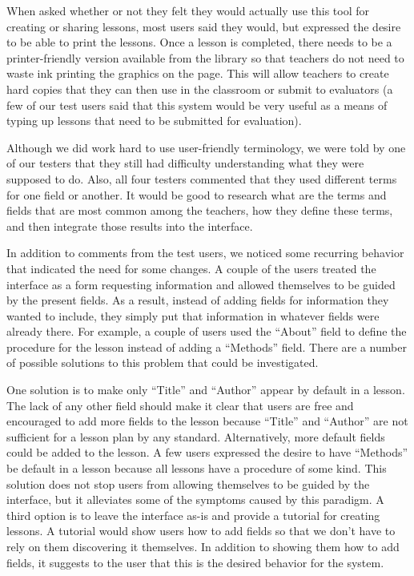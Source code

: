 \documentclass[10pt,letter]{article}
\begin{document}
When asked whether or not they felt they would actually use this tool for
creating or sharing lessons, most users said they would, but expressed the
desire to be able to print the lessons. Once a lesson is completed, there needs
to be a printer-friendly version available from the library so that teachers do
not need to waste ink printing the graphics on the page. This will allow
teachers to create hard copies that they can then use in the classroom or submit
to evaluators (a few of our test users said that this system would be very
useful as a means of typing up lessons that need to be submitted for evaluation).

Although we did work hard to use user-friendly terminology, we were told by
one of our testers that they still had difficulty understanding what they were
supposed to do.  Also, all four testers commented that they used different
terms for one field or another.  It would be good to research what are the
terms and fields that are most common among the teachers, how they define these
terms, and then integrate those results into the interface.

In addition to comments from the test users, we noticed some recurring behavior
that indicated the need for some changes. A couple of the users treated the
interface as a form requesting information and allowed themselves to be guided
by the present fields. As a result, instead of adding fields for information
they wanted to include, they simply put that information in whatever fields were
already there. For example, a couple of users used the ``About'' field to define
the procedure for the lesson instead of adding a ``Methods'' field. There are a
number of possible solutions to this problem that could be investigated.

One solution is to make only ``Title'' and ``Author'' appear by default in a
lesson.  The lack of any other field should make it clear that users are free
and encouraged to add more fields to the lesson because ``Title'' and ``Author''
are not sufficient for a lesson plan by any standard. Alternatively, more
default fields could be added to the lesson. A few users expressed the desire to
have ``Methods'' be default in a lesson because all lessons have a procedure of
some kind. This solution does not stop users from allowing themselves to be
guided by the interface, but it alleviates some of the symptoms caused by this
paradigm. A third option is to leave the interface as-is and provide a tutorial
for creating lessons. A tutorial would show users how to add fields so that we
don't have to rely on them discovering it themselves. In addition to showing
them how to add fields, it suggests to the user that this is the desired
behavior for the system.
\end{document}
